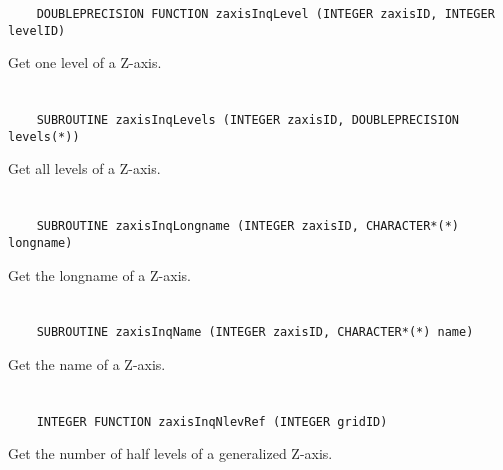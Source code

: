 \begin{verbatim}
    DOUBLEPRECISION FUNCTION zaxisInqLevel (INTEGER zaxisID, INTEGER levelID)
\end{verbatim}

Get one level of a Z-axis.


\section*{\tt {}}

\begin{verbatim}
    SUBROUTINE zaxisInqLevels (INTEGER zaxisID, DOUBLEPRECISION levels(*))
\end{verbatim}

Get all levels of a Z-axis.


\section*{\tt {}}

\begin{verbatim}
    SUBROUTINE zaxisInqLongname (INTEGER zaxisID, CHARACTER*(*) longname)
\end{verbatim}

Get the longname of a Z-axis.


\section*{\tt {}}

\begin{verbatim}
    SUBROUTINE zaxisInqName (INTEGER zaxisID, CHARACTER*(*) name)
\end{verbatim}

Get the name of a Z-axis.


\section*{\tt {}}

\begin{verbatim}
    INTEGER FUNCTION zaxisInqNlevRef (INTEGER gridID)
\end{verbatim}

Get the number of half levels of a generalized Z-axis.


\section*{\tt {}}

